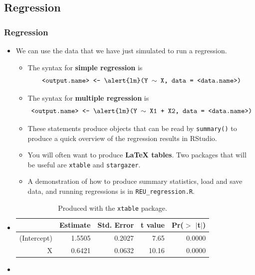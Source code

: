 \documentclass{beamer}
\begin{document}
\subsection{Regression}

\begin{frame}[allowframebreaks]
 \frametitle{Regression}

	\begin{itemize}
		\item
		We can use the data that we have just simulated to run a regression.
		\begin{itemize}
			\item
			The syntax for \textbf{simple regression} is
			\begin{align*}
				\texttt{<output.name> <- \alert{lm}(Y $\sim$ X, data = <data.name>)} 
			\end{align*}
			\item
			The syntax for \textbf{multiple regression} is
			\begin{align*}
				\texttt{<output.name> <- \alert{lm}(Y $\sim$ X1 + X2, data = <data.name>)} 
			\end{align*}
			\item
			These statements produce objects that can be read by \texttt{summary()} to produce a quick overview of the regression results in RStudio.
			\item
			You will often want to produce \textbf{LaTeX tables}. Two packages that will be useful are \texttt{xtable} and \texttt{stargazer}.
			\item
			A demonstration of how to produce summary statistics, load and save data, and running regressions is in \texttt{\scriptsize REU\_regression.R}.
		\end{itemize}
		\item[]
		\begin{table}[ht]
		\centering \scriptsize
		  \caption{Produced with the \texttt{xtable} package.}
		  \label{}
		\begin{tabular}{rrrrr}
		  \hline
		 & Estimate & Std. Error & t value & Pr($>$ $|$t$|$) \\ 
		  \hline
		(Intercept) & 1.5505 & 0.2027 & 7.65 & 0.0000 \\ 
		  X & 0.6421 & 0.0632 & 10.16 & 0.0000 \\ 
		   \hline
		\end{tabular}
		\end{table}
		\vskip8cm
		\item[]
		\begin{table}[!htbp] \centering  \scriptsize

\end{table}
\end{itemize}
\end{frame}
\end{document}
